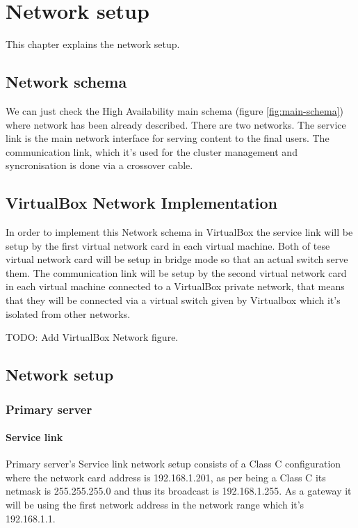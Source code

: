 

\chapter{Network setup}
\label{chap:network-setup}
This chapter explains the network setup.

\section {Network schema}
We can just check the High Availability main schema (figure \ref{fig:main-schema}) where network has been already described. There are two networks. The service link is the main network interface for serving content to the final users. The communication link, which it's used for the cluster management and syncronisation is done via a crossover cable.

\section {VirtualBox Network Implementation}

In order to implement this Network schema in VirtualBox the service link will be setup by the first virtual network card in each virtual machine. Both of tese virtual network card will be setup in bridge mode so that an actual switch serve them. The communication link will be setup by the second virtual network card in each virtual machine connected to a VirtualBox private network, that means that they will be connected via a virtual switch given by Virtualbox which it's isolated from other networks.

TODO: Add VirtualBox Network figure.

\section {Network setup}

\subsection {Primary server}
\subsubsection {Service link}
Primary server's Service link network setup consists of a Class C configuration where the network card address is 192.168.1.201, as per being a Class C its netmask is 255.255.255.0 and thus its broadcast is 192.168.1.255. As a gateway it will be using the first network address in the network range which it's 192.168.1.1.

